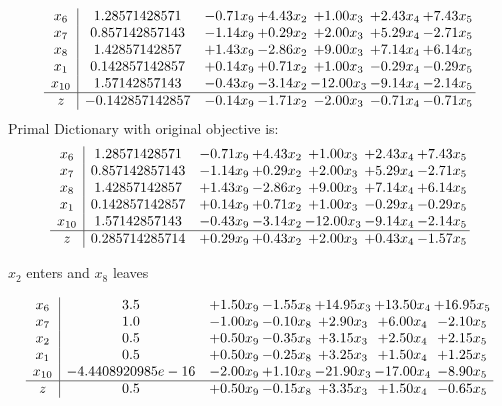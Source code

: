 \documentclass[8pt]{article}
\begin{document}
\[\begin{array}{c| c c@{\hskip 2pt} c@{\hskip 2pt} c@{\hskip 2pt} c@{\hskip 2pt} c@{\hskip 2pt} }
 x_{6}   &  1.28571428571 & -0.71 x_{9} & +  4.43 x_{2} & +  1.00 x_{3} & +  2.43 x_{4} & +  7.43 x_{5}\\
 x_{7}   &  0.857142857143 & -1.14 x_{9} & +  0.29 x_{2} & +  2.00 x_{3} & +  5.29 x_{4} & -2.71 x_{5}\\
 x_{8}   &  1.42857142857 & +  1.43 x_{9} & -2.86 x_{2} & +  9.00 x_{3} & +  7.14 x_{4} & +  6.14 x_{5}\\
 x_{1}   &  0.142857142857 & +  0.14 x_{9} & +  0.71 x_{2} & +  1.00 x_{3} & -0.29 x_{4} & -0.29 x_{5}\\
 x_{10}   &  1.57142857143 & -0.43 x_{9} & -3.14 x_{2} & -12.00 x_{3} & -9.14 x_{4} & -2.14 x_{5}\\
\hline
z    &  -0.142857142857 & -0.14 x_{9} & -1.71 x_{2} & -2.00 x_{3} & -0.71 x_{4} & -0.71 x_{5}\\
\end{array}\]
Primal Dictionary with original objective is:
\[\begin{array}{c| c c@{\hskip 2pt} c@{\hskip 2pt} c@{\hskip 2pt} c@{\hskip 2pt} c@{\hskip 2pt} }
 x_{6}   &  1.28571428571 & -0.71 x_{9} & +  4.43 x_{2} & +  1.00 x_{3} & +  2.43 x_{4} & +  7.43 x_{5}\\
 x_{7}   &  0.857142857143 & -1.14 x_{9} & +  0.29 x_{2} & +  2.00 x_{3} & +  5.29 x_{4} & -2.71 x_{5}\\
 x_{8}   &  1.42857142857 & +  1.43 x_{9} & -2.86 x_{2} & +  9.00 x_{3} & +  7.14 x_{4} & +  6.14 x_{5}\\
 x_{1}   &  0.142857142857 & +  0.14 x_{9} & +  0.71 x_{2} & +  1.00 x_{3} & -0.29 x_{4} & -0.29 x_{5}\\
 x_{10}   &  1.57142857143 & -0.43 x_{9} & -3.14 x_{2} & -12.00 x_{3} & -9.14 x_{4} & -2.14 x_{5}\\
\hline
z    &  0.285714285714 & +  0.29 x_{9} & +  0.43 x_{2} & +  2.00 x_{3} & +  0.43 x_{4} & -1.57 x_{5}\\
\end{array}\]


 $ x_{2} $ enters and $ x_{8} $ leaves 

 \[\begin{array}{c| c c@{\hskip 2pt} c@{\hskip 2pt} c@{\hskip 2pt} c@{\hskip 2pt} c@{\hskip 2pt} }
 x_{6}   &  3.5 & +  1.50 x_{9} & -1.55 x_{8} & + 14.95 x_{3} & + 13.50 x_{4} & + 16.95 x_{5}\\
 x_{7}   &  1.0 & -1.00 x_{9} & -0.10 x_{8} & +  2.90 x_{3} & +  6.00 x_{4} & -2.10 x_{5}\\
 x_{2}   &  0.5 & +  0.50 x_{9} & -0.35 x_{8} & +  3.15 x_{3} & +  2.50 x_{4} & +  2.15 x_{5}\\
 x_{1}   &  0.5 & +  0.50 x_{9} & -0.25 x_{8} & +  3.25 x_{3} & +  1.50 x_{4} & +  1.25 x_{5}\\
 x_{10}   &  -4.4408920985e-16 & -2.00 x_{9} & +  1.10 x_{8} & -21.90 x_{3} & -17.00 x_{4} & -8.90 x_{5}\\
\hline
z    &  0.5 & +  0.50 x_{9} & -0.15 x_{8} & +  3.35 x_{3} & +  1.50 x_{4} & -0.65 x_{5}\\
\end{array}\]
\end{document}
